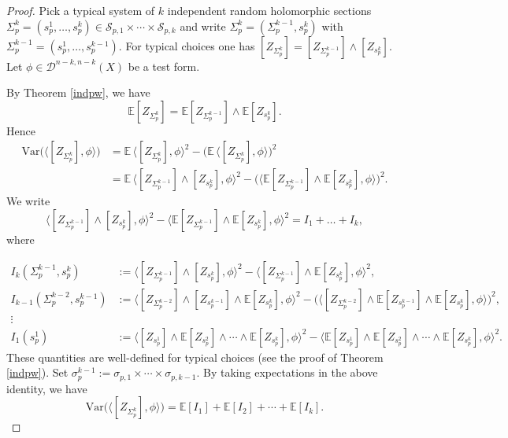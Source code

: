 \documentclass[11pt,leqno,oneside]{amsart}
\numberwithin{equation}{section}
\begin{document}
\begin{proof}


Pick a typical system of $k$ independent random holomorphic sections
$\Sigma_p^{k}=(s_p^{1},\ldots,s_p^{k})\in \mathcal{S}_{p,1}\times\cdots\times \mathcal{S}_{p,k}$ and write
$\Sigma_p^{k}=(\Sigma_p^{k-1},s_p^{k})$ with $\Sigma_p^{k-1}=(s_p^{1},\ldots,s_p^{k-1})$.
For typical choices one has
$[Z_{\Sigma_p^{k}}]=[Z_{\Sigma_p^{k-1}}]\wedge [Z_{s_p^{k}}]$.
Let $\phi\in \mathcal{D}^{n-k,n-k}(X)$ be a test form.

By Theorem \ref{indpw}, we have
$$
\mathbb{E}[Z_{\Sigma_p^{k}}]=\mathbb{E}[Z_{\Sigma_p^{k-1}}]\wedge \mathbb{E}[Z_{s_p^{k}}].
$$
Hence
\begin{equation}\label{varidef}
\begin{aligned}
\mathrm{Var}\big(\langle [Z_{\Sigma_p^{k}}],\phi\rangle\big)
&=\mathbb{E}\,\langle [Z_{\Sigma_p^{k}}],\phi\rangle^{2}
-\big(\mathbb{E}\,\langle [Z_{\Sigma_p^{k}}],\phi\rangle\big)^{2} \\
&=\mathbb{E}\,\langle [Z_{\Sigma_p^{k-1}}]\wedge [Z_{s_p^{k}}],\phi\rangle^{2}
-\Big(\big\langle \mathbb{E}[Z_{\Sigma_p^{k-1}}]\wedge \mathbb{E}[Z_{s_p^{k}}],\phi\big\rangle\Big)^{2}.
\end{aligned}
\end{equation}
We write
$$
\langle [Z_{\Sigma_p^{k-1}}]\wedge [Z_{s_p^{k}}],\phi\rangle^{2}
-\big\langle \mathbb{E}[Z_{\Sigma_p^{k-1}}]\wedge \mathbb{E}[Z_{s_p^{k}}],\phi\big\rangle^{2}
= I_1+ \ldots +I_k,
$$
where

\begin{align}
I_k(\Sigma_p^{k-1},s^{k}_{p}) &:=\langle [Z_{\Sigma_p^{k-1}}]\wedge [Z_{s_p^{k}}],\phi\rangle^{2}
-\langle [Z_{\Sigma_p^{k-1}}]\wedge \mathbb{E}[Z_{s_p^{k}}],\phi\rangle^{2}, \\ \nonumber
I_{k-1}(\Sigma_p^{k-2},s^{k-1}_{p}) &:=\langle [Z_{\Sigma_p^{k-2}}]\wedge [Z_{s^{k-1}_{p}}] \wedge \mathbb{E}[Z_{s_p^{k}}],\phi\rangle^{2}
-\big(\langle [Z_{\Sigma_p^{k-2}}]\wedge \mathbb{E}[Z_{s^{k-1}_{p}}] \wedge \mathbb{E}[Z_{s_p^{k}}],\phi\rangle\big)^{2}, \\ \nonumber
\vdots \\ \nonumber
I_{1}(s^{1}_{p}) &:= \langle [Z_{s_p^{1}}]\wedge \mathbb{E}[Z_{s_p^{2}}] \wedge \cdots \wedge \mathbb{E}[Z_{s^{k}_{p}}],\phi\rangle^{2}
-\langle \mathbb{E}[Z_{s_p^{1}}]\wedge \mathbb{E}[Z_{s^{2}_{p}}] \wedge \cdots \wedge \mathbb{E}[Z_{s_p^{k}}],\phi\rangle^{2}. \nonumber
\end{align}
These quantities are well-defined for typical choices (see the proof of Theorem \ref{indpw}).
Set $\sigma_p^{k-1}:=\sigma_{p,1}\times\cdots\times \sigma_{p,k-1}$.
By taking expectations in the above identity, we have
\begin{equation}\label{sumvar}
\mathrm{Var}\big(\langle [Z_{\Sigma_p^{k}}],\phi\rangle\big)=\mathbb{E}[I_1]+\mathbb{E}[I_2] + \cdots + \mathbb{E}[I_{k}].
\end{equation}



\end{proof}
\end{document}
